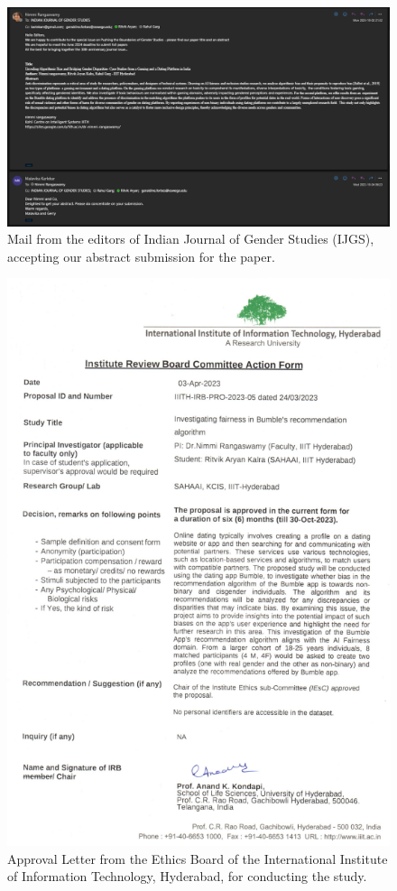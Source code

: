 \begin{figure}[h]
 \centering
 \includegraphics[scale=0.5]{figures/Supplimentary Material/Journal Paper Acceptance.png}
 \caption{Mail from the editors of Indian Journal of Gender Studies (IJGS), accepting our abstract submission for the paper.}
 \label{fig:img6}
\end{figure}

\begin{figure}[h]
 \centering
 \includegraphics[scale=0.8]{figures/Supplimentary Material/Ethics Board Apporval.png}
 \caption{Approval Letter from the Ethics Board of the International Institute of Information Technology, Hyderabad, for conducting the study.}
 \label{fig:img7}
\end{figure}

